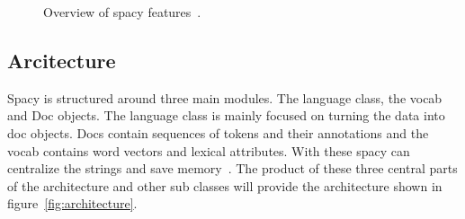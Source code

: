\begin{figure}[h]
    \caption{Overview of spacy features~\cite{spaCy101}.}
    \label{fig:features}
\end{figure}


\subsection{Arcitecture}\label{subsec:architecture}

Spacy is structured around three main modules.
The language class, the vocab and Doc objects.
The language class is mainly focused on turning the data into doc objects.
Docs contain sequences of tokens and their annotations and the vocab contains word vectors and lexical attributes.
With these spacy can centralize the strings and save memory~\cite{spaCy101}.
The product of these three central parts of the architecture and other sub classes will provide the
architecture shown in figure~\ref{fig:architecture}.
\clearpage


